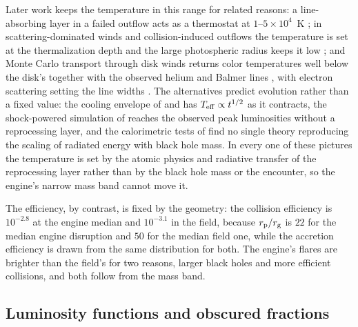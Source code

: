 \documentclass[twocolumn,pdftex]{aastex701}
\begin{document}
Later work keeps the temperature in this range for related reasons: a line-absorbing layer in a failed outflow acts as a thermostat at $1$--$5 \times 10^{4}$~K \citep{Cao:2018a}; in scattering-dominated winds and collision-induced outflows the temperature is set at the thermalization depth and the large photospheric radius keeps it low \citep{Piro:2020a,Lu:2020a}; and Monte Carlo transport through disk winds returns color temperatures well below the disk's together with the observed helium and Balmer lines \citep{Parkinson:2022a}, with electron scattering setting the line widths \citep{Roth:2018a}. The alternatives predict evolution rather than a fixed value: the cooling envelope of \citet{Metzger:2022a} and \citet{Sarin:2024a} has $T_{\rm eff} \propto t^{1/2}$ as it contracts, the shock-powered simulation of \citet{Steinberg:2024a} reaches the observed peak luminosities without a reprocessing layer, and the calorimetric tests of \citet{Mummery:2025b} find no single theory reproducing the scaling of radiated energy with black hole mass. In every one of these pictures the temperature is set by the atomic physics and radiative transfer of the reprocessing layer rather than by the black hole mass or the encounter, so the engine's narrow mass band cannot move it.

The efficiency, by contrast, is fixed by the geometry: the collision efficiency is $10^{-2.8}$ at the engine median and $10^{-3.1}$ in the field, because $r_{\rm p}/r_{\rm g}$ is $22$ for the median engine disruption and $50$ for the median field one, while the accretion efficiency is drawn from the same distribution for both. The engine's flares are brighter than the field's for two reasons, larger black holes and more efficient collisions, and both follow from the mass band.

\subsection{Luminosity functions and obscured fractions}\label{subsec:lf}
\end{document}
